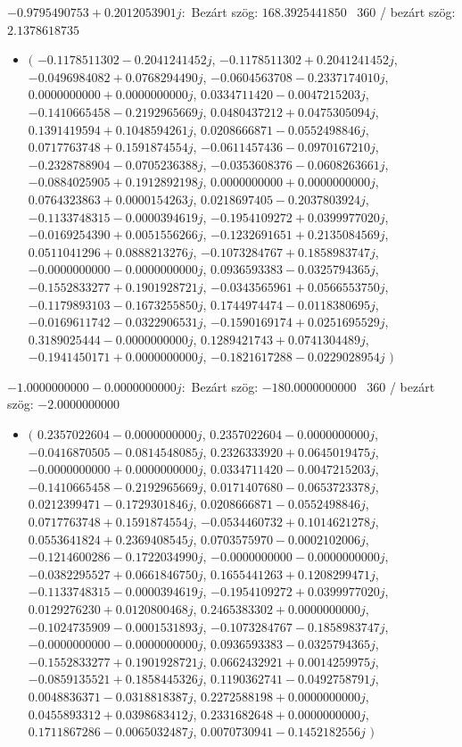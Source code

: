\documentclass[14pt,a4paper]{article}
\begin{document}
$-0.9795490753+0.2012053901j$:\
Bezárt szög: $168.3925441850$ \
360 / bezárt szög: $2.1378618735$\
\begin{itemize}
\item
$\big($
$-0.1178511302-0.2041241452j$, $-0.1178511302+0.2041241452j$, $-0.0496984082+0.0768294490j$, $-0.0604563708-0.2337174010j$, $0.0000000000+0.0000000000j$, $0.0334711420-0.0047215203j$, $-0.1410665458-0.2192965669j$, $0.0480437212+0.0475305094j$, $0.1391419594+0.1048594261j$, $0.0208666871-0.0552498846j$, $0.0717763748+0.1591874554j$, $-0.0611457436-0.0970167210j$, $-0.2328788904-0.0705236388j$, $-0.0353608376-0.0608263661j$, $-0.0884025905+0.1912892198j$, $0.0000000000+0.0000000000j$, $0.0764323863+0.0000154263j$, $0.0218697405-0.2037803924j$, $-0.1133748315-0.0000394619j$, $-0.1954109272+0.0399977020j$, $-0.0169254390+0.0051556266j$, $-0.1232691651+0.2135084569j$, $0.0511041296+0.0888213276j$, $-0.1073284767+0.1858983747j$, $-0.0000000000-0.0000000000j$, $0.0936593383-0.0325794365j$, $-0.1552833277+0.1901928721j$, $-0.0343565961+0.0566553750j$, $-0.1179893103-0.1673255850j$, $0.1744974474-0.0118380695j$, $-0.0169611742-0.0322906531j$, $-0.1590169174+0.0251695529j$, $0.3189025444-0.0000000000j$, $0.1289421743+0.0741304489j$, $-0.1941450171+0.0000000000j$, $-0.1821617288-0.0229028954j$
$\big)$
\end{itemize}
$-1.0000000000-0.0000000000j$:\
Bezárt szög: $-180.0000000000$ \
360 / bezárt szög: $-2.0000000000$\
\begin{itemize}
\item
$\big($
$0.2357022604-0.0000000000j$, $0.2357022604-0.0000000000j$, $-0.0416870505-0.0814548085j$, $0.2326333920+0.0645019475j$, $-0.0000000000+0.0000000000j$, $0.0334711420-0.0047215203j$, $-0.1410665458-0.2192965669j$, $0.0171407680-0.0653723378j$, $0.0212399471-0.1729301846j$, $0.0208666871-0.0552498846j$, $0.0717763748+0.1591874554j$, $-0.0534460732+0.1014621278j$, $0.0553641824+0.2369408545j$, $0.0703575970-0.0002102006j$, $-0.1214600286-0.1722034990j$, $-0.0000000000-0.0000000000j$, $-0.0382295527+0.0661846750j$, $0.1655441263+0.1208299471j$, $-0.1133748315-0.0000394619j$, $-0.1954109272+0.0399977020j$, $0.0129276230+0.0120800468j$, $0.2465383302+0.0000000000j$, $-0.1024735909-0.0001531893j$, $-0.1073284767-0.1858983747j$, $-0.0000000000-0.0000000000j$, $0.0936593383-0.0325794365j$, $-0.1552833277+0.1901928721j$, $0.0662432921+0.0014259975j$, $-0.0859135521+0.1858445326j$, $0.1190362741-0.0492758791j$, $0.0048836371-0.0318818387j$, $0.2272588198+0.0000000000j$, $0.0455893312+0.0398683412j$, $0.2331682648+0.0000000000j$, $0.1711867286-0.0065032487j$, $0.0070730941-0.1452182556j$
$\big)$
\end{itemize}
\end{document}
